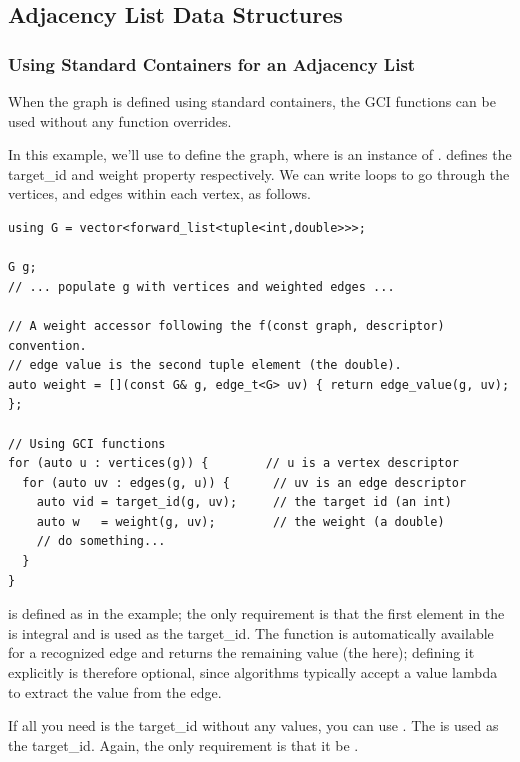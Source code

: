 \subsection{Adjacency List Data Structures}

\subsubsection{Using Standard Containers for an Adjacency List}
When the graph is defined using standard containers, the GCI functions can be used without any function overrides.

In this example, we'll use  to define the graph, where  
is an instance of .  defines the target\_id and weight property respectively. We
can write loops to go through the vertices, and edges within each vertex, as follows.

\begin{lstlisting}
using G = vector<forward_list<tuple<int,double>>>;

G g;
// ... populate g with vertices and weighted edges ...

// A weight accessor following the f(const graph, descriptor) convention.
// edge value is the second tuple element (the double).
auto weight = [](const G& g, edge_t<G> uv) { return edge_value(g, uv); };

// Using GCI functions
for (auto u : vertices(g)) {        // u is a vertex descriptor
  for (auto uv : edges(g, u)) {      // uv is an edge descriptor
    auto vid = target_id(g, uv);     // the target id (an int)
    auto w   = weight(g, uv);        // the weight (a double)
    // do something...
  }
}
\end{lstlisting}

 is defined as  in the example; the only requirement is that the first element
in the  is integral and is used as the target\_id. The  function is automatically
available for a recognized  edge and returns the remaining value (the  here); defining it
explicitly is therefore optional, since algorithms typically accept a value lambda to extract the value from the edge.

If all you need is the target\_id without any values, you can use . The 
is used as the target\_id. Again, the only requirement is that it be .

